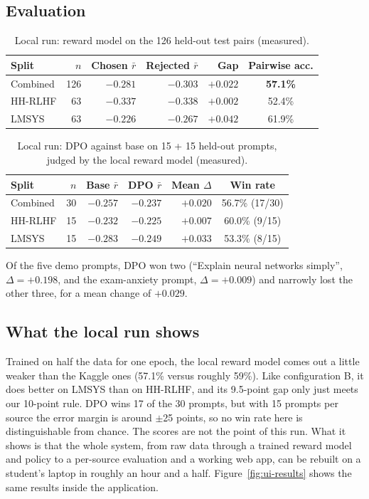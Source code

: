 \subsection{Evaluation}
\begin{table}[!htbp]
\centering
\caption[Local run: reward-model test results]{Local run: reward model on the 126 held-out test pairs (measured).}
\label{tab:local-rm}
\small
\begin{tabular}{@{}lrrrrc@{}}
\toprule
\textbf{Split} & \textbf{$n$} & \textbf{Chosen $\bar r$} & \textbf{Rejected $\bar r$} & \textbf{Gap} & \textbf{Pairwise acc.}\\
\midrule
Combined & 126 & $-0.281$ & $-0.303$ & $+0.022$ & \textbf{57.1\%}\\
HH-RLHF & 63 & $-0.337$ & $-0.338$ & $+0.002$ & 52.4\%\\
LMSYS & 63 & $-0.226$ & $-0.267$ & $+0.042$ & 61.9\%\\
\bottomrule
\end{tabular}
\end{table}

\begin{table}[!htbp]
\centering
\caption[Local run: DPO vs.\ base win rates]{Local run: DPO against base on 15 + 15 held-out prompts, judged by the local reward model (measured).}
\label{tab:local-dpo}
\small
\begin{tabular}{@{}lrrrrc@{}}
\toprule
\textbf{Split} & \textbf{$n$} & \textbf{Base $\bar r$} & \textbf{DPO $\bar r$} & \textbf{Mean $\Delta$} & \textbf{Win rate}\\
\midrule
Combined & 30 & $-0.257$ & $-0.237$ & $+0.020$ & 56.7\% (17/30)\\
HH-RLHF & 15 & $-0.232$ & $-0.225$ & $+0.007$ & 60.0\% (9/15)\\
LMSYS & 15 & $-0.283$ & $-0.249$ & $+0.033$ & 53.3\% (8/15)\\
\bottomrule
\end{tabular}
\end{table}

Of the five demo prompts, DPO won two (``Explain neural networks simply'', $\Delta=+0.198$, and the exam-anxiety prompt, $\Delta=+0.009$) and narrowly lost the other three, for a mean change of $+0.029$.

\subsection{What the local run shows}
Trained on half the data for one epoch, the local reward model comes out a little weaker than the Kaggle ones (57.1\% versus roughly 59\%). Like configuration B, it does better on LMSYS than on HH-RLHF, and its 9.5-point gap only just meets our 10-point rule. DPO wins 17 of the 30 prompts, but with 15 prompts per source the error margin is around $\pm$25 points, so no win rate here is distinguishable from chance. The scores are not the point of this run. What it shows is that the whole system, from raw data through a trained reward model and policy to a per-source evaluation and a working web app, can be rebuilt on a student's laptop in roughly an hour and a half. Figure~\ref{fig:ui-results} shows the same results inside the application.

